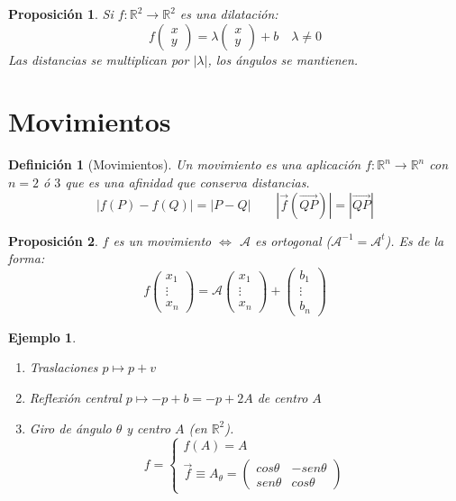 \documentclass[11pt, a4paper, titlepage]{article}
\newcommand{\R}{\mathbb{R}}
\renewcommand{\vec}{\overrightarrow}
\theoremstyle{theorem-style}
\newtheorem*{nprop}{Proposición}
\theoremstyle{definition-style}
\newtheorem*{ndef}{Definición}
\theoremstyle{remark-style}
\theoremstyle{example-style}
\newtheorem*{ejemplo}{Ejemplo}
\newenvironment{nlist}
{\begin{enumerate}
\renewcommand\labelenumi{(\emph{\roman{enumi})}}}
{\end{enumerate}}
\begin{document}
\begin{nprop}
	Si $f:\R^2 \to \R^2$ es una dilatación:
	\[
	f \begin{pmatrix}
 x\\
 y 
\end{pmatrix} = \lambda\begin{pmatrix}
 x\\
 y 
\end{pmatrix} + b \quad \lambda \ne 0
	\]
	Las distancias se multiplican por $|\lambda|$, los ángulos se mantienen.
\end{nprop}

\section{Movimientos}

\begin{ndef}[Movimientos]
	Un movimiento es una aplicación $f:\R^n \to \R^n$ con $n= 2$ ó $3$ que es una afinidad que conserva distancias.
	\[
	|f(P)-f(Q)|= |P-Q| \quad  \quad |\vec{f}(\vec{QP})|= |\vec{QP}|
	\]
\end{ndef}

\begin{nprop}
	$f$ es un movimiento $\iff$ $\mathcal A$ es ortogonal ($\mathcal A ^{-1}= \mathcal A ^t$). Es de la forma:
	\[
	f \begin{pmatrix}
x_1\\
\vdots\\
x_n 
\end{pmatrix} = \mathcal A \begin{pmatrix}
x_1\\
\vdots\\
x_n 
\end{pmatrix} + \begin{pmatrix}
b_1\\
\vdots\\
b_n 
\end{pmatrix}
	\]
\end{nprop}


\begin{ejemplo}
	\begin{nlist}
	\item Traslaciones $p \mapsto p+v$
	\item Reflexión central $p \mapsto -p +b= -p +2A$ de centro $A$
	\item Giro de ángulo $\theta$ y centro $A$ (en $\R^2$).
	\[
	f= \begin{cases}
	f(A) = A \\
	\vec{f} \equiv A_{\theta} = \begin{pmatrix}
 cos \theta & -sen \theta\\
 sen \theta & cos \theta
\end{pmatrix} 
\end{cases}
	\]
\end{nlist}
\end{ejemplo}
\end{document}
